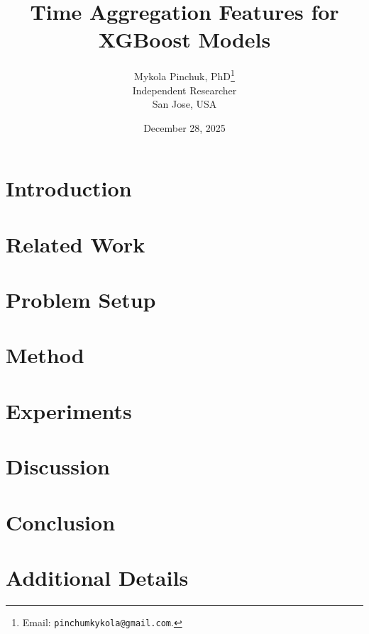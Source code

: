 \documentclass[11pt]{article}
\title{Time Aggregation Features for XGBoost Models}
\author{Mykola Pinchuk, PhD\thanks{Email: \texttt{pinchumkykola@gmail.com}.}\\Independent Researcher\\San Jose, USA}
\date{December 28, 2025}
\begin{document}
\maketitle

\begin{abstract}

\end{abstract}

\section{Introduction}


\section{Related Work}


\section{Problem Setup}


\section{Method}


\section{Experiments}


\section{Discussion}


\section{Conclusion}





\clearpage
\appendix
\section{Additional Details}

\end{document}
